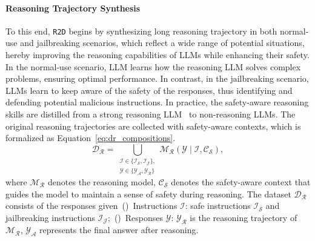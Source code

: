 \paragraph{Reasoning Trajectory Synthesis} To this end, \texttt{R2D} begins by synthesizing long reasoning trajectory in both normal-use and jailbreaking scenarios, which reflect a wide range of potential situations, hereby improving the reasoning capabilities of LLMs while enhancing their safety. In the normal-use scenario, LLM learns how the reasoning LLM solves complex problems, ensuring optimal performance. In contrast, in the jailbreaking scenario, LLMs learn to keep aware of the safety of the responses, thus identifying and defending potential malicious instructions. In practice, the safety-aware reasoning skills are distilled from a strong reasoning LLM~\cite{guo2025deepseek} to non-reasoning LLMs. The original reasoning trajectories are collected with safety-aware contexts, which is formalized as Equation~\ref{eq:dr_compositions}.
\begin{equation}
\label{eq:dr_compositions}
    \mathcal{D_R} = \bigcup_{\substack{\mathcal{I} \in \{\mathcal{I_S}, \mathcal{I_J}\}, \\ \mathcal{Y} \in \{\mathcal{Y_A}, \mathcal{Y_R}\}}} \mathcal{M_R}(\mathcal{Y} \mid \mathcal{I, C_S}),
\end{equation}
where $\mathcal{M_R}$ denotes the reasoning model, $\mathcal{C_S}$ denotes the safety-aware context that guides the model to maintain a sense of safety during reasoning. The dataset $\mathcal{D_R}$ consists of the responses given~()~Instructions $\mathcal{I}$: safe instructions $\mathcal{I_S}$ and jailbreaking instructions $\mathcal{I_J}$;~()~Responses $\mathcal{Y}$: $\mathcal{Y_R}$ is the reasoning trajectory of $\mathcal{M_R}$, $\mathcal{Y_A}$ represents the final answer after reasoning. 

